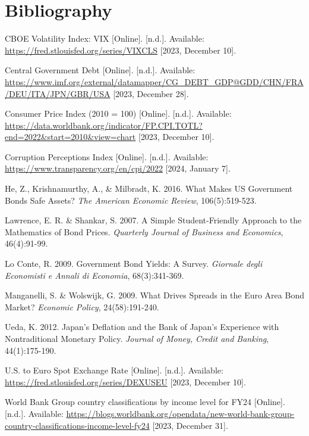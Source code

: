 \documentclass[11pt,preprint, authoryear]{elsarticle}
\numberwithin{equation}{section}
\numberwithin{figure}{section}
\numberwithin{table}{section}
\begin{document}
\newpage

\hypertarget{bibliography}{%
\section{Bibliography}\label{bibliography}}

CBOE Volatility Index: VIX {[}Online{]}. {[}n.d.{]}. Available:
\url{https://fred.stlouisfed.org/series/VIXCLS} {[}2023, December 10{]}.

Central Government Debt {[}Online{]}. {[}n.d.{]}. Available:
\url{https://www.imf.org/external/datamapper/CG_DEBT_GDP@GDD/CHN/FRA/DEU/ITA/JPN/GBR/USA}
{[}2023, December 28{]}.

Consumer Price Index (2010 = 100) {[}Online{]}. {[}n.d.{]}. Available:
\url{https://data.worldbank.org/indicator/FP.CPI.TOTL?end=2022\&start=2010\&view=chart}
{[}2023, December 10{]}.

Corruption Perceptions Index {[}Online{]}. {[}n.d.{]}. Available:
\url{https://www.transparency.org/en/cpi/2022} {[}2024, January 7{]}.

He, Z., Krishnamurthy, A., \& Milbradt, K. 2016. What Makes US
Government Bonds Safe Assets? \emph{The American Economic Review},
106(5):519-523.

Lawrence, E. R. \& Shankar, S. 2007. A Simple Student-Friendly Approach
to the Mathematics of Bond Prices. \emph{Quarterly Journal of Business
and Economics}, 46(4):91-99.

Lo Conte, R. 2009. Government Bond Yields: A Survey. \emph{Giornale
degli Economisti e Annali di Economia}, 68(3):341-369.

Manganelli, S. \& Wolswijk, G. 2009. What Drives Spreads in the Euro
Area Bond Market? \emph{Economic Policy}, 24(58):191-240.

Ueda, K. 2012. Japan's Deflation and the Bank of Japan's Experience with
Nontraditional Monetary Policy. \emph{Journal of Money, Credit and
Banking}, 44(1):175-190.

U.S. to Euro Spot Exchange Rate {[}Online{]}. {[}n.d.{]}. Available:
\url{https://fred.stlouisfed.org/series/DEXUSEU} {[}2023, December
10{]}.

World Bank Group country classifications by income level for FY24
{[}Online{]}. {[}n.d.{]}. Available:
\url{https://blogs.worldbank.org/opendata/new-world-bank-group-country-classifications-income-level-fy24}
{[}2023, December 31{]}.


\end{document}

